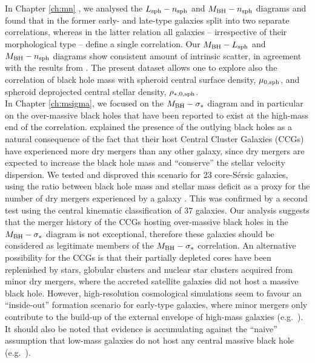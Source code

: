 In Chapter \ref{ch:mn} \citep{paperIII}, 
we analysed the $L_{\rm sph} - n_{\rm sph}$ and $M_{\rm BH} - n_{\rm sph}$ diagrams 
and found that in the former early- and late-type galaxies split into two separate correlations, 
whereas in the latter relation all galaxies -- irrespective of their morphological type -- define a single correlation. 
Our $M_{\rm BH} - L_{\rm sph}$ and $M_{\rm BH} - n_{\rm sph}$ diagrams 
show consistent amount of intrinsic scatter, 
in agreement with the results from \citet{grahamdriver2007}. 
The present dataset allows one to explore also the correlation of black hole mass with 
spheroid central surface density, $\mu_{\rm 0, sph}$, 
and spheroid deprojected central stellar density, $\rho_{\rm *,0,sph}$. \\

In Chapter \ref{ch:msigma}, we focused on the $M_{\rm BH} - \sigma_*$ diagram 
and in particular on the over-massive black holes that have been reported to exist 
at the high-mass end of the correlation. 
\citet{volontericiotti2013} explained the presence of the outlying black holes 
as a natural consequence of the fact that their host Central Cluster Galaxies (CCGs) have experienced more dry mergers 
than any other galaxy, 
since dry mergers are expected to increase the black hole mass 
and ``conserve'' the stellar velocity dispersion. 
We tested and disproved this scenario for 23 core-S\'ersic galaxies, 
using the ratio between black hole mass and stellar mass deficit as a proxy 
for the number of dry mergers experienced by a galaxy \citep{merritt2006}. 
This was confirmed by a second test using the central kinematic classification of 37 galaxies. 
Our analysis suggests that 
the merger history of the CCGs hosting over-massive black holes in the $M_{\rm BH} - \sigma_*$ diagram 
is not exceptional, 
therefore these galaxies should be considered as legitimate members of the $M_{\rm BH} - \sigma_*$ correlation. 
An alternative possibility for the CCGs is that their partially depleted cores 
have been replenished by stars, globular clusters and nuclear star clusters 
acquired from minor dry mergers, 
where the accreted satellite galaxies did not host a massive black hole. 
However, high-resolution cosmological simulations seem to favour an ``inside-out'' formation scenario 
for early-type galaxies, 
where minor mergers only contribute to the build-up of the external envelope of high-mass galaxies 
(e.g.~\citealt{wellons2016}). 
It should also be noted that evidence is accumulating against the ``naive'' assumption 
that low-mass galaxies do not host any central massive black hole 
(e.g.~\citealt{Baldassare2015,Graham2016LEDA}). \\

